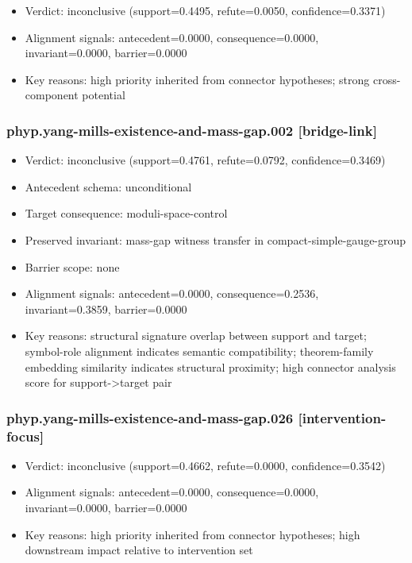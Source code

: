 \documentclass[
]{article}
\newcounter{none} %
\providecommand{\tightlist}{%
  \setlength{\itemsep}{0pt}\setlength{\parskip}{0pt}}
\begin{document}
\begin{itemize}
\tightlist
\item
  Verdict: inconclusive (support=0.4495, refute=0.0050,
  confidence=0.3371)
\item
  Alignment signals: antecedent=0.0000, consequence=0.0000,
  invariant=0.0000, barrier=0.0000
\item
  Key reasons: high priority inherited from connector hypotheses; strong
  cross-component potential
\end{itemize}

\subsubsection{phyp.yang-mills-existence-and-mass-gap.002
{[}bridge-link{]}}\label{phypyang-mills-existence-and-mass-gap002-bridge-link}

\begin{itemize}
\tightlist
\item
  Verdict: inconclusive (support=0.4761, refute=0.0792,
  confidence=0.3469)
\item
  Antecedent schema: unconditional
\item
  Target consequence: moduli-space-control
\item
  Preserved invariant: mass-gap witness transfer in
  compact-simple-gauge-group
\item
  Barrier scope: none
\item
  Alignment signals: antecedent=0.0000, consequence=0.2536,
  invariant=0.3859, barrier=0.0000
\item
  Key reasons: structural signature overlap between support and target;
  symbol-role alignment indicates semantic compatibility; theorem-family
  embedding similarity indicates structural proximity; high connector
  analysis score for support-\textgreater target pair
\end{itemize}

\subsubsection{phyp.yang-mills-existence-and-mass-gap.026
{[}intervention-focus{]}}\label{phypyang-mills-existence-and-mass-gap026-intervention-focus}

\begin{itemize}
\tightlist
\item
  Verdict: inconclusive (support=0.4662, refute=0.0000,
  confidence=0.3542)
\item
  Alignment signals: antecedent=0.0000, consequence=0.0000,
  invariant=0.0000, barrier=0.0000
\item
  Key reasons: high priority inherited from connector hypotheses; high
  downstream impact relative to intervention set
\end{itemize}
\end{document}

